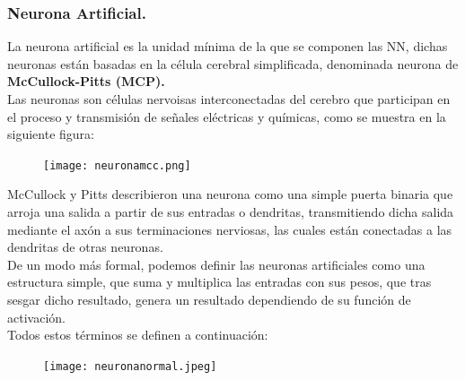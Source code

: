 \documentclass[a4paper,10pt]{article}
\begin{document}
\subsubsection{Neurona Artificial.}
La neurona artificial es la unidad mínima de la que se componen las NN, dichas neuronas están basadas en la célula cerebral simplificada, denominada neurona de \textbf{McCullock-Pitts (MCP).}\\ Las neuronas son células nervoisas interconectadas del cerebro que participan en el proceso y transmisión de señales eléctricas y químicas, como se muestra en la siguiente figura: \\
\begin{figure}[H]
\centering
\texttt{[image: neuronamcc.png]}
\end{figure}
\noindent
McCullock y Pitts describieron una neurona como una simple puerta binaria que arroja una salida a partir de sus entradas o dendritas, transmitiendo dicha salida mediante el axón a sus terminaciones nerviosas, las cuales están conectadas a las dendritas de otras neuronas.\\
De un modo más formal, podemos definir las neuronas artificiales como una estructura simple, que suma y multiplica las entradas con sus pesos, que tras sesgar dicho resultado, genera un resultado dependiendo de su función de activación. \\Todos estos términos se definen a continuación:
\begin{figure}[H]
\centering
\texttt{[image: neuronanormal.jpeg]}
\end{figure}
\end{document}
